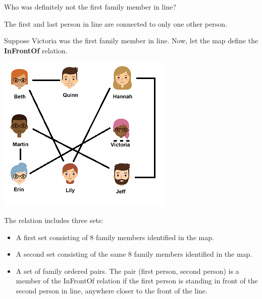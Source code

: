\documentclass{ximera}
\begin{document}
\begin{exercise}
Who was definitely not the first family member in line?

  \begin{selectAll}
  \end{selectAll}
  \begin{feedback}
The first and last person in line are connected to only one other person.
  \end{feedback}
\end{exercise}





  \begin{definition}
  Suppose Victoria was the first family member in line. Now, let the map define the \textbf{InFrontOf} relation.
  
  \includegraphics[width=321px,height=285px]{pics/standinline.png}
  
  The  relation includes three sets:
    \begin{itemize}
    \item A first set consisting of 8 family members identified in the map.
    \item A second set consisting of the same 8 family members identified in the map.
    \item A set of family ordered pairs. The pair (first person, second person) is a member of the InFrontOf relation if the first person is standing in front of the second person in line, anywhere closer to the front of the line.
    \end{itemize}
  \end{definition}
\end{document}
